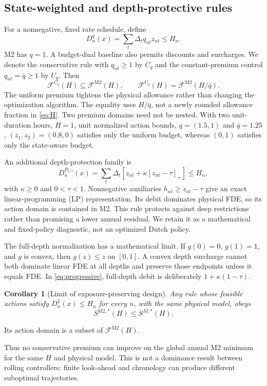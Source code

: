\documentclass[10pt,journal]{IEEEtran}
\newtheorem{corollary}{Corollary}
\newcommand{\pos}[1]{\left[#1\right]_+}
\newcommand{\Mtwo}{\mathrm{M2}}
\newcommand{\F}{\mathcal F}
\begin{document}
\subsection{State-weighted and depth-protective rules}
For a nonnegative, fixed rate schedule, define
\begin{equation}
D_n^q(x)=\sum_t\Delta_tq_{nt}z_{nt}\leq H_n.
\label{eq:weighted}
\end{equation}
M2 has $q=1$. A budget-dual baseline also permits discounts and surcharges. We denote the conservative rule with $q_{nt}\geq1$ by $C_q$ and the constant-premium control $q_{nt}=\bar q\geq1$ by $U_{\bar q}$. Then
\begin{equation}
\F^{C_q}(H)\subseteq\F^{\Mtwo}(H),\qquad
\F^{U_{\bar q}}(H)=\F^{\Mtwo}(H/\bar q).
\label{eq:conservative}
\end{equation}
The uniform premium tightens the physical allowance rather than changing the optimization algorithm. The equality uses $H/\bar q$, not a newly rounded allowance fraction in \eqref{eq:H}. Two premium domains need not be nested. With two unit-duration hours, $H=1$, unit normalized action bounds, $q=(1.5,1)$ and $\bar q=1.25$, $(z_1,z_2)=(0.8,0)$ satisfies only the uniform budget, whereas $(0,1)$ satisfies only the state-aware budget.

An additional depth-protection family is
\begin{equation}
D_n^{P_{\kappa,\tau}}(x)=\sum_t\Delta_t
[z_{nt}+\kappa\pos{z_{nt}-\tau}]\leq H_n,
\label{eq:progressive}
\end{equation}
with $\kappa\geq0$ and $0<\tau<1$. Nonnegative auxiliaries $h_{nt}\geq z_{nt}-\tau$ give an exact linear-programming (LP) representation. Its debit dominates physical FDE, so its action domain is contained in M2. This rule protects against deep restrictions rather than promising a lower annual residual. We retain it as a mathematical and fixed-policy diagnostic, not an optimized Dutch policy.

The full-depth normalization has a mathematical limit. If $g(0)=0$, $g(1)=1$, and $g$ is convex, then $g(z)\leq z$ on $[0,1]$. A convex depth surcharge cannot both dominate linear FDE at all depths and preserve those endpoints unless it equals FDE. In \eqref{eq:progressive}, full-depth debit is deliberately $1+\kappa(1-\tau)$.

\begin{corollary}[Limit of exposure-preserving design]
\label{cor:limit}
Any rule whose feasible actions satisfy $D_n^2(x)\leq H_n$ for every $n$, with the same physical model, obeys
\begin{equation}
S^{\Mtwo,*}(H)\leq S^{M,*}(H).
\label{eq:dominance}
\end{equation}
\end{corollary}
\begin{IEEEproof}
Its action domain is a subset of $\F^{\Mtwo}(H)$.
\end{IEEEproof}
Thus no conservative premium can improve on the global annual M2 minimum for the same $H$ and physical model. This is not a dominance result between rolling controllers: finite look-ahead and chronology can produce different suboptimal trajectories.
\end{document}
